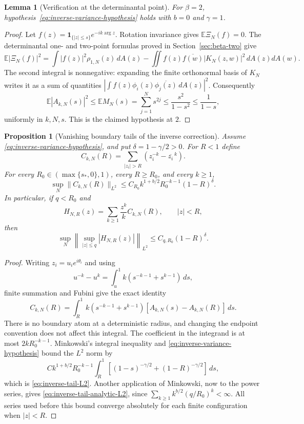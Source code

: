 \documentclass[11pt,a4paper]{article}
\numberwithin{equation}{section}
\newtheorem{proposition}[theorem]{Proposition}
\newtheorem{lemma}[theorem]{Lemma}
\theoremstyle{definition}
\theoremstyle{remark}
\begin{document}
\begin{lemma}[Verification at the determinantal point]
\label{lem:inverse-variance-beta-two}
For $\beta=2$, hypothesis~\eqref{eq:inverse-variance-hypothesis} holds
with $b=0$ and $\gamma=1$.
\end{lemma}
\begin{proof}
Let $f(z)=\mathbf1_{\{|z|\le s\}}e^{-ik\arg z}$. Rotation invariance
gives $\mathbb E\Xi_N(f)=0$. The determinantal one- and two-point
formulas proved in Section~\ref{sec:beta-two} give
\[
 \mathbb E|\Xi_N(f)|^2
 =\int |f(z)|^2\rho_{1,N}(z)\,dA(z)
  -\iint f(z)\overline{f(w)}|K_N(z,w)|^2\,dA(z)dA(w).
\]
The second integral is nonnegative: expanding the finite orthonormal
basis of $K_N$ writes it as a sum of quantities
$|\int f(z)\phi_i(z)\overline{\phi_j(z)}\,dA(z)|^2$.
Consequently
\[
 \mathbb E|A_{k,N}(s)|^2\le\mathbb E M_N(s)
 =\sum_{j=1}^N s^{2j}
 \le\frac{s^2}{1-s^2}\le\frac1{1-s},
\]
uniformly in $k,N,s$. This is the claimed hypothesis at $2$.
\end{proof}

\begin{proposition}[Vanishing boundary tails of the inverse correction]
\label{prop:inverse-correction-tail}
Assume \eqref{eq:inverse-variance-hypothesis}, and put
$\delta=1-\gamma/2>0$. For $R<1$ define
\[
 C_{k,N}(R)=\sum_{|z_i|>R}(z_i^{-k}-\overline{z_i}^{\,k}).
\]
For every $R_0\in(\max\{s_*,0\},1)$, every $R\geq R_0$, and every
$k\geq1$,
\begin{equation}\label{eq:inverse-tail-L2}
 \sup_N\|C_{k,N}(R)\|_{L^2}
 \leq C_{R_0} k^{1+b/2}R_0^{-k-1}(1-R)^\delta.
\end{equation}
In particular, if $q<R_0$ and
\[
 H_{N,R}(z)=\sum_{k\geq1}\frac{z^k}{k}C_{k,N}(R),
 \qquad |z|<R,
\]
then
\begin{equation}\label{eq:inverse-tail-analytic-L2}
 \sup_N\left\|\sup_{|z|\leq q}|H_{N,R}(z)|\right\|_{L^2}
 \leq C_{q,R_0}(1-R)^\delta.
\end{equation}
\end{proposition}
\begin{proof}
Writing $z_i=u_i e^{i\theta_i}$ and using
\[
 u^{-k}-u^k=\int_u^1 k(s^{-k-1}+s^{k-1})\,ds,
\]
finite summation and Fubini give the exact identity
\begin{equation}\label{eq:inverse-tail-Abel}
 C_{k,N}(R)=\int_R^1 k(s^{-k-1}+s^{k-1})
                   [A_{k,N}(s)-A_{k,N}(R)]\,ds.
\end{equation}
There is no boundary atom at a deterministic radius, and changing the
endpoint convention does not affect this integral. The coefficient in
the integrand is at most $2kR_0^{-k-1}$. Minkowski's integral inequality
and \eqref{eq:inverse-variance-hypothesis} bound the $L^2$ norm by
\[
 C k^{1+b/2}R_0^{-k-1}
   \int_R^1[(1-s)^{-\gamma/2}+(1-R)^{-\gamma/2}]\,ds,
\]
which is \eqref{eq:inverse-tail-L2}. Another application of Minkowski,
now to the power series, gives \eqref{eq:inverse-tail-analytic-L2}, since
$\sum_{k\geq1}k^{b/2}(q/R_0)^k<\infty$. All series used before this
bound converge absolutely for each finite configuration when $|z|<R$.
\end{proof}
\end{document}
